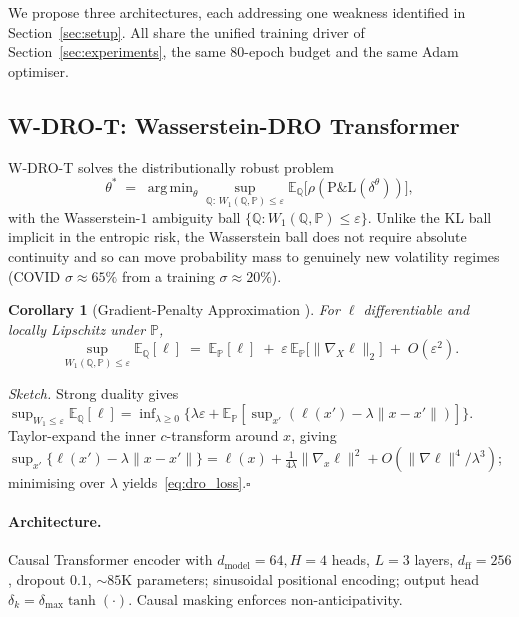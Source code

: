 \documentclass[11pt]{article}
\newcommand{\E}{\mathbb{E}}
\newcommand{\PP}{\mathbb{P}}
\newcommand{\QQ}{\mathbb{Q}}
\newcommand{\argmin}{\mathop{\mathrm{arg\,min}}}
\newtheorem{corollary}{Corollary}
\begin{document}
We propose three architectures, each addressing one weakness identified in Section~\ref{sec:setup}.  All share the unified training driver of Section~\ref{sec:experiments}, the same $80$-epoch budget and the same Adam optimiser.

\subsection{W-DRO-T: Wasserstein-DRO Transformer}\label{sec:wdrot}

W-DRO-T solves the distributionally robust problem
\begin{equation}
\theta^* \;=\; \argmin_\theta \sup_{\QQ:\,W_1(\QQ,\PP)\le\varepsilon} \E_\QQ\!\bigl[\rho(\mathrm{P\&L}(\delta^\theta))\bigr],
\label{eq:dro_obj}
\end{equation}
with the Wasserstein-$1$ ambiguity ball $\{\QQ: W_1(\QQ,\PP)\le\varepsilon\}$.  Unlike the KL ball implicit in the entropic risk, the Wasserstein ball does not require absolute continuity and so can move probability mass to genuinely new volatility regimes (COVID $\sigma\approx 65\%$ from a training $\sigma\approx 20\%$).

\begin{corollary}[Gradient-Penalty Approximation \citep{blanchet2019quantifying}]
\label{cor:grad_penalty}
For $\ell$ differentiable and locally Lipschitz under $\PP$,
\begin{equation}
\sup_{W_1(\QQ,\PP)\le\varepsilon}\E_\QQ[\ell] \;=\; \E_\PP[\ell] \;+\; \varepsilon\,\E_\PP\!\bigl[\|\nabla_X\ell\|_2\bigr] \;+\; O(\varepsilon^2).
\label{eq:dro_loss}
\end{equation}
\end{corollary}

\noindent\textit{Sketch.} Strong duality gives $\sup_{W_1\le\varepsilon}\E_\QQ[\ell] = \inf_{\lambda\ge 0}\{\lambda\varepsilon + \E_\PP[\sup_{x'}(\ell(x') - \lambda\|x-x'\|)]\}$.  Taylor-expand the inner $c$-transform around $x$, giving $\sup_{x'}\{\ell(x')-\lambda\|x-x'\|\} = \ell(x) + \tfrac{1}{4\lambda}\|\nabla_x\ell\|^2 + O(\|\nabla\ell\|^4/\lambda^3)$; minimising over $\lambda$ yields~\eqref{eq:dro_loss}.\hfill$\square$

\paragraph{Architecture.}  Causal Transformer encoder with $d_{\mathrm{model}}=64, H=4$ heads, $L=3$ layers, $d_{\mathrm{ff}}=256$, dropout $0.1$, $\sim 85$K parameters; sinusoidal positional encoding; output head $\delta_k=\delta_{\max}\tanh(\cdot)$.  Causal masking enforces non-anticipativity.
\end{document}
